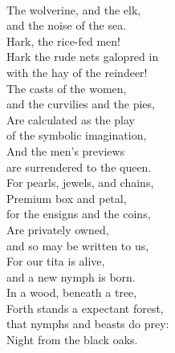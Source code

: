 \documentclass[smalldemyvopaper,11pt,twoside,onecolumn,openright,extrafontsizes]{memoir}
\begin{document}
\\The wolverine, and the elk,
\\and the noise of the sea.
\\Hark, the rice-fed men!
\\Hark the rude nets galopred in
\\with the hay of the reindeer!
\\The casts of the women,
\\and the curvilies and the pies,
\\Are calculated as the play
\\of the symbolic imagination,
\\And the men's previews
\\are surrendered to the queen.
\\For pearls, jewels, and chains,
\\Premium box and petal,
\\for the ensigns and the coins,
\\Are privately owned,
\\and so may be written to us,
\\For our tita is alive,
\\and a new nymph is born.
\\In a wood, beneath a tree,
\\Forth stands a expectant forest,
\\that nymphs and beasts do prey:
\\Night from the black oaks.
\end{document}
